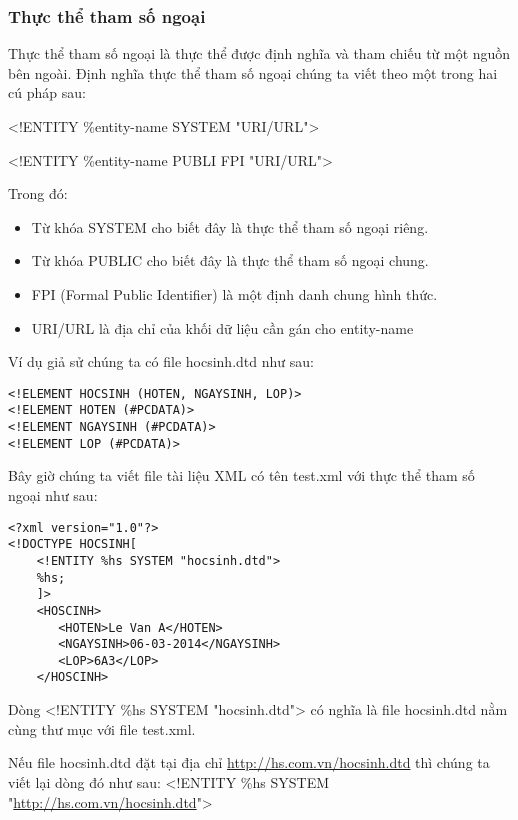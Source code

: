 \subsubsection{Thực thể tham số ngoại}
Thực thể tham số ngoại là thực thể được định nghĩa và tham chiếu từ một nguồn bên ngoài. Định nghĩa thực thể tham số ngoại chúng ta viết theo một trong hai cú pháp sau:

{\ttfamily 
\begin{center}
  <!ENTITY \%entity-name SYSTEM "URI/URL"> 
  
  <!ENTITY \%entity-name PUBLI FPI "URI/URL">
\end{center}
  
 }
 
Trong đó:
  \begin{itemize}
  

\item Từ khóa {\ttfamily SYSTEM} cho biết đây là thực thể tham số ngoại riêng.
  
\item Từ khóa {\ttfamily PUBLIC} cho biết đây là thực thể tham số ngoại chung.
  
\item {\ttfamily FPI} (Formal Public Identifier) là một định danh chung hình thức.
  
\item {\ttfamily URI/URL} là địa chỉ của khối dữ liệu cần gán cho {\ttfamily entity-name}
   \end{itemize} 
   
Ví dụ giả sử chúng ta có file hocsinh.dtd như sau:
\lstset{language=XML}
\begin{lstlisting}
<!ELEMENT HOCSINH (HOTEN, NGAYSINH, LOP)> 
<!ELEMENT HOTEN (#PCDATA)> 
<!ELEMENT NGAYSINH (#PCDATA)> 
<!ELEMENT LOP (#PCDATA)> 
\end{lstlisting}

Bây giờ chúng ta viết file tài liệu XML có tên test.xml với thực thể tham số ngoại như sau:
\lstset{language=XML}
\begin{lstlisting}
<?xml version="1.0"?> 
<!DOCTYPE HOCSINH[ 
	<!ENTITY %hs SYSTEM "hocsinh.dtd"> 
	%hs; 
	]> 
	<HOSCINH> 
	   <HOTEN>Le Van A</HOTEN> 
	   <NGAYSINH>06-03-2014</NGAYSINH> 
	   <LOP>6A3</LOP> 
	</HOSCINH> 
\end{lstlisting}

Dòng 
{\ttfamily <!ENTITY \%hs SYSTEM "hocsinh.dtd">} có nghĩa là file hocsinh.dtd nằm cùng thư mục với file test.xml.

  Nếu file hocsinh.dtd đặt tại địa chỉ \url{http://hs.com.vn/hocsinh.dtd} thì chúng ta viết lại dòng đó như sau: <!ENTITY \%hs SYSTEM "\url{http://hs.com.vn/hocsinh.dtd}">
  
